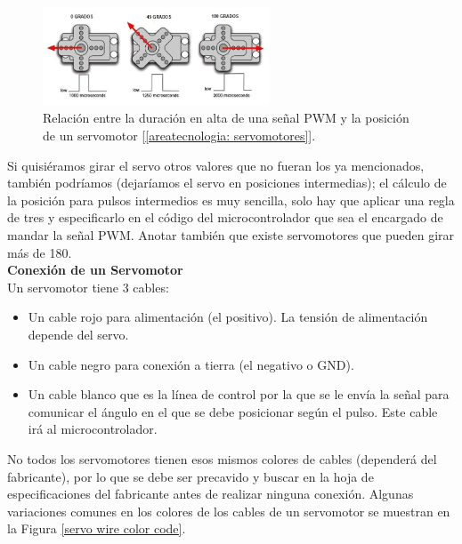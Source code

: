 \documentclass[12pt]{article}
\begin{document}
	
	\begin{figure}[h!]
		\begin{center}
			\includegraphics[width=0.6\textwidth]{img/posicion_servomotor.png}
			\caption{Relación entre la duración en alta de una señal PWM y la posición de un servomotor [\ref{areatecnologia: servomotores}].}
			\label{posicion servo}
		\end{center}
	\end{figure}
	
	\noindent Si quisiéramos girar el servo otros valores que no fueran los ya mencionados, también podríamos (dejaríamos el servo en posiciones intermedias); el cálculo de la posición para pulsos intermedios es muy sencilla, solo hay que aplicar una regla de tres y especificarlo en el código del microcontrolador que sea el encargado de mandar la señal PWM. Anotar también que existe servomotores que pueden girar más de 180\degree.\\
	
	\noindent \textbf{Conexión de un Servomotor} \\
	
	\noindent Un servomotor tiene 3 cables: 
	
	\begin{itemize}
		\item Un cable rojo para alimentación (el positivo). La tensión de alimentación depende del servo.
		\item Un cable negro para conexión a tierra (el negativo o GND).
		\item Un cable blanco que es la línea de control por la que se le envía la señal para comunicar el ángulo en el que se debe posicionar según el pulso. Este cable irá al microcontrolador.
	\end{itemize}

	\noindent No todos los servomotores tienen esos mismos colores de cables (dependerá del fabricante), por lo que se debe ser precavido y buscar en la hoja de especificaciones del fabricante antes de realizar ninguna conexión. Algunas variaciones comunes en los colores de los cables de un servomotor se muestran en la Figura \ref{servo wire color code}. \\
	
\end{document}
